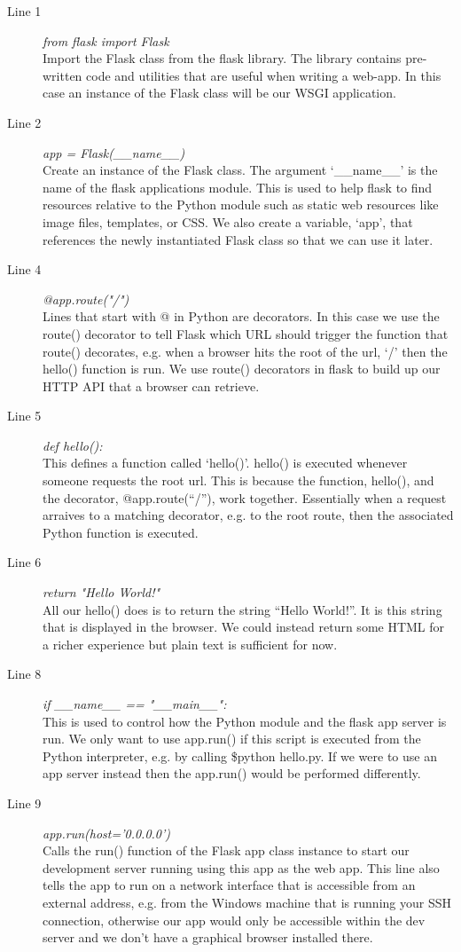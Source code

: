 \begin{description}
\item[Line 1] \emph{from flask import Flask}\\ 
Import the Flask class from the flask library. The library contains pre-written code and utilities that are useful when writing a web-app. In this case an instance of the Flask class will be our WSGI application.
\item[Line 2] \emph{app = Flask(\_\_name\_\_)}\\
Create an instance of the Flask class. The argument `\_\_name\_\_' is the name of the flask applications module. This is used to help flask to find resources relative to the Python module such as static web resources like image files, templates, or CSS. We also create a variable, `app', that references the newly instantiated Flask class so that we can use it later.
\item[Line 4] \emph{@app.route("/")}\\
Lines that start with @ in Python are decorators. In this case we use the route() decorator to tell Flask which URL should trigger the function that route() decorates, e.g. when a browser hits the root of the url, `/' then the hello() function is run. We use route() decorators in flask to build up our HTTP API that a browser can retrieve.
\item[Line 5] \emph{def hello():}\\
This defines a function called `hello()'. hello() is executed whenever someone requests the root url. This is because the function, hello(), and the decorator, @app.route(``/''), work together. Essentially when a request arraives to a matching decorator, e.g. to the root route, then the associated Python function is executed.
\item[Line 6] \emph{return "Hello World!"}\\
All our hello() does is to return the string ``Hello World!''. It is this string that is displayed in the browser. We could instead return some HTML for a richer experience but plain text is sufficient for now.
\item[Line 8] \emph{if \_\_name\_\_ == "\_\_main\_\_":}\\
This is used to control how the Python module and the flask app server is run. We only want to use app.run() if this script is executed from the Python interpreter, e.g. by calling \$python hello.py. If we were to use an app server instead then the app.run() would be performed differently.
\item[Line 9] \emph{app.run(host='0.0.0.0')
}\\
Calls the run() function of the Flask app class instance to start our development server running using this app as the web app. This line also tells the app to run on a network interface that is accessible from an external address, e.g. from the Windows machine that is running your SSH connection, otherwise our app would only be accessible within the dev server and we don't have a graphical browser installed there.
\end{description}

